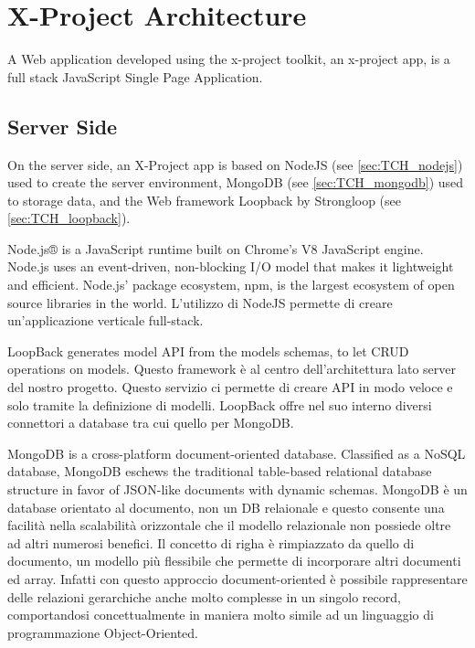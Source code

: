 \section{X-Project Architecture}
\label{sec:XPR_arc}

A Web application developed using the x-project toolkit, an x-project app, is a full stack JavaScript Single Page Application.

\subsection{Server Side}
\label{subsec:XPR_arc_serv}

On the server side, an X-Project app is based on NodeJS (see \ref{sec:TCH_nodejs}) used to create the server environment, MongoDB (see \ref{sec:TCH_mongodb}) used to storage data, and the Web framework Loopback by Strongloop (see \ref{sec:TCH_loopback}).

Node.js® is a JavaScript runtime built on Chrome's V8 JavaScript engine. Node.js uses an event-driven, non-blocking I/O model that makes it lightweight and efficient. Node.js' package ecosystem, npm, is the largest ecosystem of open source libraries in the world. L'utilizzo di NodeJS permette di creare un'applicazione verticale full-stack.

LoopBack generates model API from the models schemas, to let CRUD operations on models. Questo framework è al centro dell'architettura lato server del nostro progetto. Questo servizio ci permette di creare API in modo veloce e solo tramite la definizione di modelli.
LoopBack offre nel suo interno diversi connettori a database tra cui quello per MongoDB. 

MongoDB is a cross-platform document-oriented database. Classified as a NoSQL database, MongoDB eschews the traditional table-based relational database structure in favor of JSON-like documents with dynamic schemas. MongoDB è un database orientato al documento, non un DB relaionale e questo consente una facilità nella scalabilità orizzontale che il modello relazionale non possiede oltre ad altri numerosi benefici. Il concetto di righa è rimpiazzato da quello di documento, un modello più flessibile che permette di incorporare altri documenti ed array. Infatti con questo approccio document-oriented è possibile rappresentare delle relazioni gerarchiche anche molto complesse in un singolo record, comportandosi concettualmente in maniera molto simile ad un linguaggio di programmazione Object-Oriented.


